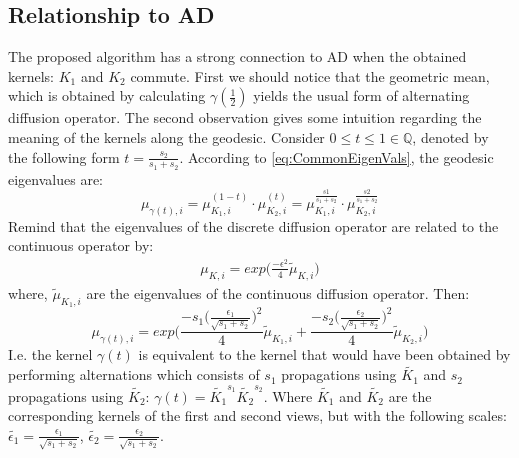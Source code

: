 \documentclass[]{article}
\theoremstyle{definition}
\begin{document}
	\subsection{Relationship to AD}
	The proposed algorithm has a strong connection to AD when the obtained kernels: $K_1$ and $K_2$ commute.
	First we should notice that the geometric mean, which is obtained by calculating $\gamma(\frac{1}{2})$ yields the usual form of alternating diffusion operator. 
	The second observation gives some intuition regarding the meaning of the kernels along the geodesic. Consider $0\leq t \leq 1 \in \mathbb{Q}$, denoted by the following form $t=\frac{s_2}{s_1+s_2}$. According to \ref{eq:CommonEigenVals}, the geodesic eigenvalues are:
	\begin{equation}
	\mu_{\gamma(t),i} = \mu_{K_1,i}^{(1-t)} \cdot \mu_{K_2,i}^{(t)} = \mu_{K_1,i}^{\frac{s1}{s_1+s_2}} \cdot \mu_{K_2,i}^{\frac{s2}{s_1+s_2}}
	\end{equation}
	Remind that the eigenvalues of the discrete diffusion operator are related to the continuous operator by:
	\begin{eqnarray*}
		\mu_{K,i}=  exp\bigg( \frac{-\epsilon ^2}{4}\widetilde{\mu}_{K,i}\bigg)
	\end{eqnarray*}
	where, ${\tilde{\mu}}_{K_1,i}$ are the eigenvalues of the continuous diffusion operator. Then:
	\begin{equation}
	\mu_{\gamma(t),i} = exp\bigg( \frac{-s_1\bigg(\frac{\epsilon_1}{\sqrt{s_1+s_2}}\bigg)^2}{4}\widetilde{\mu}_{K_1,i} + \frac{-s_2\bigg(\frac{\epsilon_2}{\sqrt{s_1+s_2}}\bigg)^2}{4}\widetilde{\mu}_{K_2,i}\bigg)
	\end{equation}
	I.e. the kernel $\gamma(t)$ is equivalent to the kernel that would have been obtained by performing alternations which consists of $s_1$ propagations using $\tilde{K_1}$ and $s_2$ propagations using $\tilde{K_2}$: $\gamma(t)=\tilde{K_1}^{s_1} \tilde{K_2}^{s_2} $. Where $\tilde{K_1}$ and $\tilde{K_2}$ are the corresponding kernels of the first and second views, but with the following scales: $\tilde{\epsilon_1}=\frac{\epsilon_1}{\sqrt{s_1+s_2}}$, $\tilde{\epsilon_2}=\frac{\epsilon_2}{\sqrt{s_1+s_2}}$.
	
\end{document}
